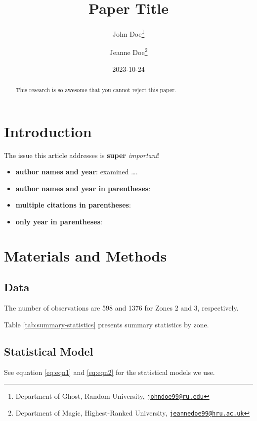 \documentclass[
]{article}
\title{Paper Title}
\author{John Doe\footnote{Department of Ghost, Random University, \href{mailto:johndoe99@ru.edu}{\nolinkurl{johndoe99@ru.edu}}} \and Jeanne Doe\footnote{Department of Magic, Highest-Ranked University, \href{mailto:jeannedoe99@hru.ac.uk}{\nolinkurl{jeannedoe99@hru.ac.uk}}}}
\date{2023-10-24}
\begin{document}
\maketitle
\begin{abstract}
This research is so awesome that you cannot reject this paper.
\end{abstract}

\newpage

\hypertarget{introduction}{%
\section{Introduction}\label{introduction}}

The issue this article addresses is \textbf{super} \emph{important}!

\begin{itemize}
\item
  \textbf{author names and year}: \citet{schlenker2009nonlinear} examined \ldots.
\item
  \textbf{author names and year in parentheses}: \citep{schlenker2009nonlinear}
\item
  \textbf{multiple citations in parentheses}: \citep{schlenker2009nonlinear, mas1995microeconomic}
\item
  \textbf{only year in parentheses}: \citeyearpar{schlenker2009nonlinear}
\end{itemize}

\hypertarget{materials-and-methods}{%
\section{Materials and Methods}\label{materials-and-methods}}

\hypertarget{data}{%
\subsection{Data}\label{data}}

The number of observations are 598 and 1376 for Zones 2 and 3, respectively.

Table \ref{tab:summary-statistics} presents summary statistics by zone.

\hypertarget{statistical-model}{%
\subsection{Statistical Model}\label{statistical-model}}

See equation \eqref{eq:eqn1} and \eqref{eq:eqn2} for the statistical models we use.
\end{document}
